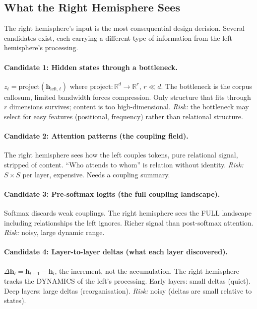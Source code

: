 \documentclass[11pt, a4paper]{article}
\newcommand{\h}{\mathbf{h}}
\newcommand{\R}{\mathbb{R}}
\theoremstyle{plain}
\theoremstyle{definition}
\theoremstyle{remark}
\begin{document}
\subsection{What the Right Hemisphere Sees}
\label{sec:what-right-sees}

The right hemisphere's input is the most consequential design decision.
Several candidates exist, each carrying a different type of information from the left hemisphere's processing.

\paragraph{Candidate 1: Hidden states through a bottleneck.}
$z_t = \mathrm{project}(\h_{\mathrm{left},t})$ where $\mathrm{project}: \R^d \to \R^r$, $r \ll d$.
The bottleneck is the corpus callosum, limited bandwidth forces compression.
Only structure that fits through $r$ dimensions survives; content is too high-dimensional.
\emph{Risk:} the bottleneck may select for easy features (positional, frequency) rather than relational structure.

\paragraph{Candidate 2: Attention patterns (the coupling field).}
The right hemisphere sees how the left couples tokens, pure relational signal, stripped of content.
``Who attends to whom'' is relation without identity.
\emph{Risk:} $S \times S$ per layer, expensive. Needs a coupling summary.

\paragraph{Candidate 3: Pre-softmax logits (the full coupling landscape).}
Softmax discards weak couplings.
The right hemisphere sees the FULL landscape including relationships the left ignores.
Richer signal than post-softmax attention.
\emph{Risk:} noisy, large dynamic range.

\paragraph{Candidate 4: Layer-to-layer deltas (what each layer discovered).}
$\Delta\h_l = \h_{l+1} - \h_l$, the increment, not the accumulation.
The right hemisphere tracks the DYNAMICS of the left's processing.
Early layers: small deltas (quiet). Deep layers: large deltas (reorganisation).
\emph{Risk:} noisy (deltas are small relative to states).
\end{document}

